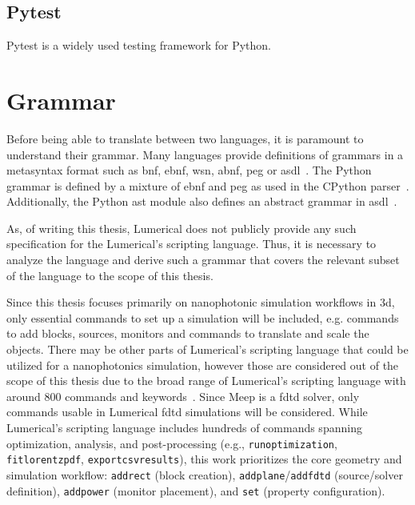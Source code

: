 \subsection{Pytest}
Pytest is a widely used testing framework for Python. 





\section{Grammar}\label{grammar}
Before being able to translate between two languages, it is paramount to understand their grammar. Many languages provide definitions of grammars in a metasyntax format such as \gls{bnf}, \gls{ebnf}, \gls{wsn}, \gls{abnf}, \gls{peg} or \gls{asdl}~\cite{asdl}. The Python grammar is defined by a mixture of \gls{ebnf} and \gls{peg} as used in the CPython parser~\cite{python3grammar}. Additionally, the Python \gls{ast} module also defines an abstract grammar in \gls{asdl}~\cite{python_ast}.

As, of writing this thesis, Lumerical does not publicly provide any such specification for the Lumerical's scripting language. Thus, it is necessary to analyze the language and derive such a grammar that covers the relevant subset of the language to the scope of this thesis.

Since this thesis focuses primarily on nanophotonic simulation workflows in \gls{3d}, only essential commands to set up a simulation will be included, e.g. commands to add blocks, sources, monitors and commands to translate and scale the objects. There may be other parts of Lumerical's scripting language that could be utilized for a nanophotonics simulation, however those are considered out of the scope of this thesis due to the broad range of Lumerical's scripting language with around 800 commands and keywords~\cite{ansys_lsf_commands}. Since Meep is a \gls{fdtd} solver, only commands usable in Lumerical \gls{fdtd} simulations will be considered.
While Lumerical’s scripting language includes hundreds of commands spanning optimization, analysis, and post-processing (e.g., \texttt{runoptimization}, \texttt{fitlorentzpdf}, \texttt{exportcsvresults}), this work prioritizes the core geometry and simulation workflow: \texttt{addrect} (block creation), \texttt{addplane}/\texttt{addfdtd} (source/solver definition), \texttt{addpower} (monitor placement), and \texttt{set} (property configuration). 


